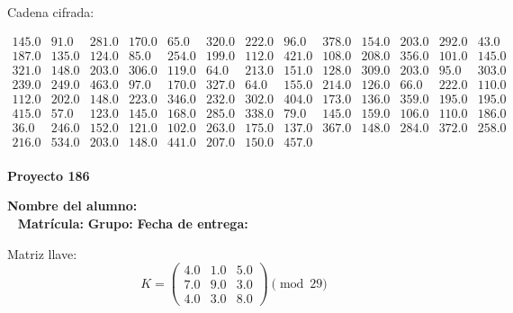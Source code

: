\documentclass[12pt]{article}
\begin{document}
Cadena cifrada:
\begin{center}
$\begin{array}{lllllllllllll}
145.0 & 91.0 & 281.0 & 170.0 & 65.0 & 320.0 & 222.0 & 96.0 & 378.0 & 154.0 & 203.0 & 292.0 & 43.0\\
187.0 & 135.0 & 124.0 & 85.0 & 254.0 & 199.0 & 112.0 & 421.0 & 108.0 & 208.0 & 356.0 & 101.0 & 145.0\\
321.0 & 148.0 & 203.0 & 306.0 & 119.0 & 64.0 & 213.0 & 151.0 & 128.0 & 309.0 & 203.0 & 95.0 & 303.0\\
239.0 & 249.0 & 463.0 & 97.0 & 170.0 & 327.0 & 64.0 & 155.0 & 214.0 & 126.0 & 66.0 & 222.0 & 110.0\\
112.0 & 202.0 & 148.0 & 223.0 & 346.0 & 232.0 & 302.0 & 404.0 & 173.0 & 136.0 & 359.0 & 195.0 & 195.0\\
415.0 & 57.0 & 123.0 & 145.0 & 168.0 & 285.0 & 338.0 & 79.0 & 145.0 & 159.0 & 106.0 & 110.0 & 186.0\\
36.0 & 246.0 & 152.0 & 121.0 & 102.0 & 263.0 & 175.0 & 137.0 & 367.0 & 148.0 & 284.0 & 372.0 & 258.0\\
216.0 & 534.0 & 203.0 & 148.0 & 441.0 & 207.0 & 150.0 & 457.0\\
\end{array}$
\end{center}

\newpage


\textbf{Proyecto 186}

\textbf{Nombre del alumno:} \underline{\hspace{13cm}}\\\
\vspace{1cm}
\textbf{Matrícula:} \underline{\hspace{4cm}} \hspace{1cm}
\textbf{Grupo:} \underline{\hspace{2cm}}
\textbf{Fecha de entrega:} \underline{\hspace{2cm}}

\medskip

Matriz llave:
\[
K = \begin{pmatrix}
4.0 & 1.0 & 5.0\\
7.0 & 9.0 & 3.0\\
4.0 & 3.0 & 8.0
\end{pmatrix} \pmod{29}
\]
\end{document}
